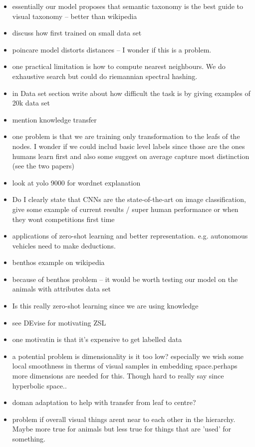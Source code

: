 \documentclass[12pt]{report}
\begin{document}
\begin{itemize}
  \item essentially our model proposes that semantic taxonomy is the best guide to visual taxonomy -- better than wikipedia 
    \item discuss how first trained on small data set
    \item poincare model distorts distances \cite{Greenberg1994} -- I wonder if this is a problem.
    \item one practical limitation is how to compute nearest neighbours. We do exhaustive search but could do riemannian spectral hashing.
    \item in Data set section write about how difficult the task is by giving examples of 20k data set
    \item mention knowledge transfer
    \item one problem is that we are training only transformation to the leafs of the nodes. I wonder if we could includ basic level labels since those are the ones humans learn first and also some suggest on average capture most distinction (see the two papers)
    \item look at yolo 9000 for wordnet explanation
    \item Do I clearly state that CNNs are the state-of-the-art on image classification, give some example of current results / super human performance or when they wont competitions first time
    \item applications of zero-shot learning and better representation. e.g. autonomous vehicles need to make deductions. 
    \item benthos example on wikipedia
    \item because of benthos problem -- it would be worth testing our model on the animals with attributes data set 
    \item Is this really zero-shot learning since we are using knowledge
    \item see DEvise for motivating ZSL
    \item one motivatin is that it's expensive to get labelled data
    \item a potential problem is dimensionality is it too low? especially we wish some local smoothness in therms of visual samples in embedding space.perhaps more dimensions are needed for this. Though hard to really say since hyperbolic space..
    \item doman adaptation to help with transfer  from leaf to centre?
    \item problem if overall visual things arent near to each other in the hierarchy. Maybe more true for animals but less true for things that are 'used' for something.

\end{itemize}
\end{document}
